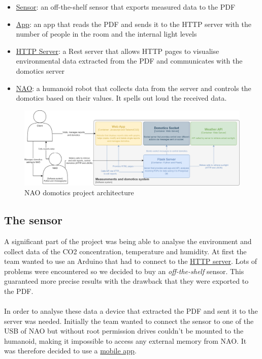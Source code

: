 \documentclass{optica-article}
\begin{document}
\begin{itemize}
    \item \hyperref[sec:domotics_sensor]{Sensor}: an off-the-shelf sensor that exports measured data to the PDF
    \item \hyperref[sec:domotics_app]{App}: an app that reads the PDF and sends it to the HTTP server with the number of people in the room and the internal light levels
    \item \hyperref[sec:domotics_server]{HTTP Server}: a Rest server that allows HTTP pages to visualise environmental data extracted from the PDF and communicates with the domotics server
    \item \hyperref[sec:domotics_nao]{NAO}: a humanoid robot that collects data from the server and controls the domotics based on their values. It spells out loud the received data.
\end{itemize}

\begin{figure}[H]
    \centering
    \includegraphics[scale=0.17]{figures/architecture_domotics.png}
    \caption{NAO domotics project architecture}
    \label{fig:my_label}
\end{figure}

\bigskip
\subsection{The sensor}\label{sec:domotics_sensor}
\vspace{5pt}
A significant part of the project was being able to analyse the environment and collect data of the CO2 concentration, temperature and humidity. At first the team wanted to use an Arduino that had to connect to the \hyperref[sec:domotics_server]{HTTP server}. Lots of problems were encountered so we decided to buy an \emph{off-the-shelf} sensor. This guaranteed more precise results with the drawback that they were exported to the PDF.\\ 
\\In order to analyse these data a device that extracted the PDF and sent it to the server was needed. Initially the team wanted to connect the sensor to one of the USB of NAO but without root permission drives couldn't be mounted to the humanoid, making it impossible to access any external memory from NAO. It was therefore decided to use a \hyperref[sec:domotics_app]{mobile app}.\\
\end{document}
